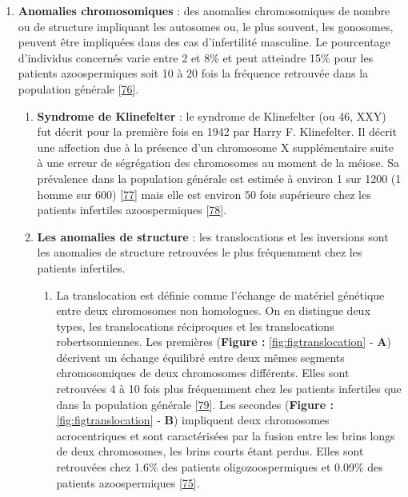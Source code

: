 \documentclass[12pt,a4paper,twoside]{ugathesis}
\providecommand{\tightlist}{%
  \setlength{\itemsep}{0pt}\setlength{\parskip}{0pt}}
\theoremstyle{definition}
\theoremstyle{definition}
\theoremstyle{definition}
\theoremstyle{remark}
\begin{document}
\begin{enumerate}
\def\labelenumi{\arabic{enumi}.}
\setcounter{enumi}{1}
\tightlist
\item
  \textbf{Anomalies chromosomiques} : des anomalies chromosomiques de
  nombre ou de structure impliquant les autosomes ou, le plus souvent,
  les gonosomes, peuvent être impliquées dans des cas d'infertilité
  masculine. Le pourcentage d'individus concernés varie entre 2 et 8\%
  et peut atteindre 15\% pour les patients azoospermiques soit 10 à 20
  fois la fréquence retrouvée dans la population générale
  {[}\protect\hyperlink{ref-Ravel2006}{76}{]}.

  \begin{enumerate}
  \def\labelenumii{\alph{enumii}.}
  \item
    \textbf{Syndrome de Klinefelter} : le syndrome de Klinefelter (ou
    46, XXY) fut décrit pour la première fois en 1942 par Harry F.
    Klinefelter. Il décrit une affection due à la présence d'un
    chromosome X supplémentaire suite à une erreur de ségrégation des
    chromosomes au moment de la méiose. Sa prévalence dans la population
    générale est estimée à environ 1 sur 1200 (1 homme sur 600)
    {[}\protect\hyperlink{ref-Bojesen2011}{77}{]} mais elle est environ
    50 fois supérieure chez les patients infertiles azoospermiques
    {[}\protect\hyperlink{ref-Gekas2001}{78}{]}.
  \item
    \textbf{Les anomalies de structure} : les translocations et les
    inversions sont les anomalies de structure retrouvées le plus
    fréquemment chez les patients infertiles.

    \begin{enumerate}
    \def\labelenumiii{\roman{enumiii}.}
    \tightlist
    \item
      La translocation est définie comme l'échange de matériel génétique
      entre deux chromosomes non homologues. On en distingue deux types,
      les translocations réciproques et les translocations
      robertsonniennes. Les premières (\textbf{Figure :}
      \ref{fig:figtranslocation} - \textbf{A}) décrivent un échange
      équilibré entre deux mêmes segments chromosomiques de deux
      chromosomes différents. Elles sont retrouvées 4 à 10 fois plus
      fréquemment chez les patients infertiles que dans la population
      générale {[}\protect\hyperlink{ref-Elliott1997}{79}{]}. Les
      secondes (\textbf{Figure :} \ref{fig:figtranslocation} -
      \textbf{B}) impliquent deux chromosomes acrocentriques et sont
      caractérisées par la fusion entre les brins longs de deux
      chromosomes, les brins courts étant perdus. Elles sont retrouvées
      chez 1.6\% des patients oligozoospermiques et 0.09\% des patients
      azoospermiques {[}\protect\hyperlink{ref-OFlynnOBrien2010}{75}{]}.
    \end{enumerate}
  \end{enumerate}
\end{enumerate}
\end{document}
